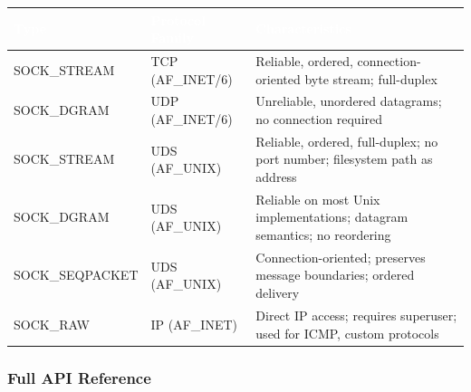 \documentclass[11pt,letterpaper]{article}
\newcommand{\tableheader}[1]{\textbf{\sffamily\textcolor{white}{#1}}}
\begin{document}
\begin{center}
\begin{tabularx}{\textwidth}{L{2.5cm}L{2.5cm}X}
\toprule
{}
\tableheader{Type} & \tableheader{Protocol Family} & \tableheader{Characteristics} \\
\midrule
SOCK\_STREAM & TCP (AF\_INET/6) & Reliable, ordered, connection-oriented byte stream; full-duplex \\
SOCK\_DGRAM & UDP (AF\_INET/6) & Unreliable, unordered datagrams; no connection required \\
SOCK\_STREAM & UDS (AF\_UNIX) & Reliable, ordered, full-duplex; no port number; filesystem path as address \\
SOCK\_DGRAM & UDS (AF\_UNIX) & Reliable on most Unix implementations; datagram semantics; no reordering \\
SOCK\_SEQPACKET & UDS (AF\_UNIX) & Connection-oriented; preserves message boundaries; ordered delivery \\
SOCK\_RAW & IP (AF\_INET) & Direct IP access; requires superuser; used for ICMP, custom protocols \\
\bottomrule
\end{tabularx}
\end{center}

\subsubsection{Full API Reference}
\end{document}
